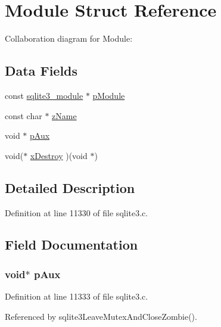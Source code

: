 \hypertarget{struct_module}{}\section{Module Struct Reference}
\label{struct_module}


Collaboration diagram for Module\+:
\subsection*{Data Fields}
\begin{DoxyCompactItemize}
\item 
const \hyperlink{structsqlite3__module}{sqlite3\+\_\+module} $\ast$ \hyperlink{struct_module_a71395f3913bd3f44e7c72118b1728f7d}{p\+Module}
\item 
const char $\ast$ \hyperlink{struct_module_ab014fc02d99cc45050cdfcda485c780a}{z\+Name}
\item 
void $\ast$ \hyperlink{struct_module_aae735e24d027e9a5d3e39ab9de5c166b}{p\+Aux}
\item 
void($\ast$ \hyperlink{struct_module_aa4fca9e7c2c7eaf8fc25b50e9a7c1329}{x\+Destroy} )(void $\ast$)
\end{DoxyCompactItemize}


\subsection{Detailed Description}


Definition at line 11330 of file sqlite3.\+c.



\subsection{Field Documentation}
\hypertarget{struct_module_aae735e24d027e9a5d3e39ab9de5c166b}{}
\subsubsection[{p\+Aux}]{\setlength{\rightskip}{0pt plus 5cm}void$\ast$ p\+Aux}\label{struct_module_aae735e24d027e9a5d3e39ab9de5c166b}


Definition at line 11333 of file sqlite3.\+c.



Referenced by sqlite3\+Leave\+Mutex\+And\+Close\+Zombie().

\hypertarget{struct_module_a71395f3913bd3f44e7c72118b1728f7d}{}
